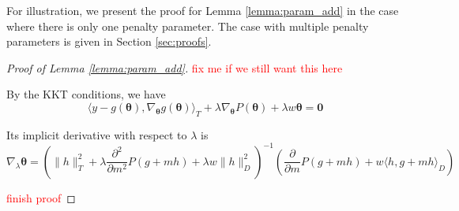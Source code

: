 \documentclass[12pt]{article}
\begin{document}

For illustration, we present the proof for Lemma \ref{lemma:param_add} in the case where there is only one penalty parameter. The case with multiple penalty parameters is given in Section \ref{sec:proofs}.

\begin{proof}[Proof of Lemma \ref{lemma:param_add}]
	\textcolor{red}{fix me if we still want this here}
	
	By the KKT conditions, we have
	\[
	\langle y-g\left( \boldsymbol{\theta} \right ),\nabla_{\boldsymbol{\theta}} g\left( \boldsymbol{\theta} \right ) \rangle_{T}
	+ \lambda \nabla_{\boldsymbol{\theta}} P(\boldsymbol{\theta})
	+\lambda w \boldsymbol{\theta} =\boldsymbol{0}
	\]
	
	
	Its implicit derivative with respect to $\lambda$ is
	\begin{equation}
	\nabla_{\lambda} \boldsymbol{\theta}  =
	\left ( 
	\| h\|_{T}^2 +\lambda\frac{\partial^{2}}{\partial m^{2}}P(g+mh) +\lambda w\|h\|_{D}^{2} 
	\right )^{-1}
	\left ( \frac{\partial}{\partial m}P(g+mh)+w\langle h,g+mh\rangle_{D} \right )
	\end{equation}
	
%	
\textcolor{red}{finish proof}
\end{proof}
\end{document}
